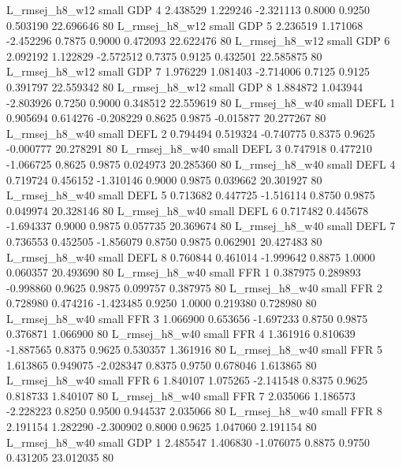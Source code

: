 L_rmsej_h8_w12      small      GDP                 4 2.438529 1.229246 -2.321113 0.8000 0.9250  0.503190   22.696646 80
L_rmsej_h8_w12      small      GDP                 5 2.236519 1.171068 -2.452296 0.7875 0.9000  0.472093   22.622476 80
L_rmsej_h8_w12      small      GDP                 6 2.092192 1.122829 -2.572512 0.7375 0.9125  0.432501   22.585875 80
L_rmsej_h8_w12      small      GDP                 7 1.976229 1.081403 -2.714006 0.7125 0.9125  0.391797   22.559342 80
L_rmsej_h8_w12      small      GDP                 8 1.884872 1.043944 -2.803926 0.7250 0.9000  0.348512   22.559619 80
L_rmsej_h8_w40      small     DEFL                 1 0.905694 0.614276 -0.208229 0.8625 0.9875 -0.015877   20.277267 80
L_rmsej_h8_w40      small     DEFL                 2 0.794494 0.519324 -0.740775 0.8375 0.9625 -0.000777   20.278291 80
L_rmsej_h8_w40      small     DEFL                 3 0.747918 0.477210 -1.066725 0.8625 0.9875  0.024973   20.285360 80
L_rmsej_h8_w40      small     DEFL                 4 0.719724 0.456152 -1.310146 0.9000 0.9875  0.039662   20.301927 80
L_rmsej_h8_w40      small     DEFL                 5 0.713682 0.447725 -1.516114 0.8750 0.9875  0.049974   20.328146 80
L_rmsej_h8_w40      small     DEFL                 6 0.717482 0.445678 -1.694337 0.9000 0.9875  0.057735   20.369674 80
L_rmsej_h8_w40      small     DEFL                 7 0.736553 0.452505 -1.856079 0.8750 0.9875  0.062901   20.427483 80
L_rmsej_h8_w40      small     DEFL                 8 0.760844 0.461014 -1.999642 0.8875 1.0000  0.060357   20.493690 80
L_rmsej_h8_w40      small      FFR                 1 0.387975 0.289893 -0.998860 0.9625 0.9875  0.099757    0.387975 80
L_rmsej_h8_w40      small      FFR                 2 0.728980 0.474216 -1.423485 0.9250 1.0000  0.219380    0.728980 80
L_rmsej_h8_w40      small      FFR                 3 1.066900 0.653656 -1.697233 0.8750 0.9875  0.376871    1.066900 80
L_rmsej_h8_w40      small      FFR                 4 1.361916 0.810639 -1.887565 0.8375 0.9625  0.530357    1.361916 80
L_rmsej_h8_w40      small      FFR                 5 1.613865 0.949075 -2.028347 0.8375 0.9750  0.678046    1.613865 80
L_rmsej_h8_w40      small      FFR                 6 1.840107 1.075265 -2.141548 0.8375 0.9625  0.818733    1.840107 80
L_rmsej_h8_w40      small      FFR                 7 2.035066 1.186573 -2.228223 0.8250 0.9500  0.944537    2.035066 80
L_rmsej_h8_w40      small      FFR                 8 2.191154 1.282290 -2.300902 0.8000 0.9625  1.047060    2.191154 80
L_rmsej_h8_w40      small      GDP                 1 2.485547 1.406830 -1.076075 0.8875 0.9750  0.431205   23.012035 80
